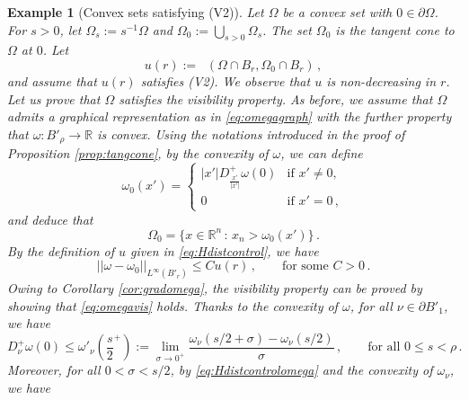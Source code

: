 \documentclass[a4paper,reqno,11pt]{amsart}
\newtheorem{example}[theorem]{Example}
\newcommand{\R}{\mathbb{R}}
\newcommand{\de}{\partial}
\newcommand{\Hdist}{\mathop{\mathrm{dist}_{\mathcal{H}}}}
\newcommand{\cO}{\mathcal{O}}
\begin{document}
\begin{example}[Convex sets satisfying (V2)] \label{ex:convex}
Let $\Omega$ be a convex set with $0 \in \de \Omega$. For $s > 0$, let $\Omega_{s} := s^{-1} \Omega$ and $\Omega_{0} := \bigcup_{s > 0} \Omega_{s}$. The set $\Omega_{0}$ is the tangent cone to $\Omega$ at $0$. Let
\begin{equation} \label{eq:Hdistcontrol}
u(r) := \Hdist(\Omega \cap B_{r}, \Omega_{0} \cap B_{r}) \, ,%
\end{equation}
and assume that $u(r)$ satisfies (V2). We observe that $u$ is non-decreasing in $r$. Let us prove that $\Omega$ satisfies the visibility property. As before, we assume that $\Omega$ admits a graphical representation as in \eqref{eq:omegagraph} with the further property that $\omega: B'_{\rho} \rightarrow \R$ is convex. Using the notations introduced in the proof of Proposition \ref{prop:tangcone}, by the convexity of $\omega$, we can define 
		\begin{equation*}
			\omega_{0}(x') = 
			\begin{cases}
				|x'| D_{\frac{x'}{|x'|}}^{+} \omega (0) & \text{if } x' \neq 0,\\ 
				0 &  \text{if } x' = 0 \, ,
			\end{cases}
		\end{equation*}
		and deduce that
		\begin{equation*}
			\Omega_{0} = \{ x \in \R^{n} \, : \, x_{n} > \omega_{0}(x') \} \, .
		\end{equation*}
		By the definition of $u$ given in \eqref{eq:Hdistcontrol}, we have
		\begin{equation} \label{eq:Hdistcontrolomega}
			||\omega - \omega_0||_{L^{\infty}(B'_r)} \leq C u(r) \, , \qquad \text{for some $C > 0 \, .$} %
		\end{equation}
		Owing to Corollary \ref{cor:gradomega}, the visibility property can be proved by showing that \eqref{eq:omegavis} holds. Thanks to the convexity of $\omega$, for all $\nu \in \de B'_{1}$, we have
		\begin{equation} \label{eq:estdir1}
			D^{+}_{\nu} \omega (0) \leq \omega'_\nu \left( \frac{s}{2}^+ \right) := \lim_{\sigma \rightarrow 0^+} \dfrac{\omega_\nu(s/2 + \sigma) - \omega_\nu(s/2)}{\sigma} \, , \qquad \text{for all $0 \leq s < \rho \, .$}
		\end{equation}
		Moreover, for all $0 < \sigma < s/2$, by \eqref{eq:Hdistcontrolomega} and the convexity of $\omega_\nu$, we have

\end{example}
\end{document}
